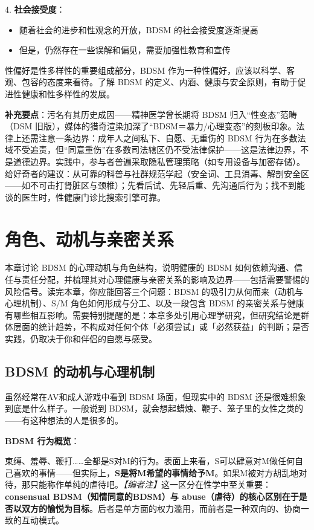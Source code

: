 \documentclass[12pt,UTF8]{ctexbook}
\begin{document}
4. \textbf{社会接受度}：
  \begin{itemize}
  \item 随着社会的进步和性观念的开放，BDSM 的社会接受度逐渐提高
  \item 但是，仍然存在一些误解和偏见，需要加强性教育和宣传
  \end{itemize}

性偏好是性多样性的重要组成部分，BDSM 作为一种性偏好，应该以科学、客观、包容的态度来看待。了解 BDSM 的定义、内涵、健康与安全原则，有助于促进性健康和性多样性的发展。

\noindent\textbf{补充要点}：污名有其历史成因——精神医学曾长期将 BDSM 归入“性变态”范畴（DSM 旧版），媒体的猎奇渲染加深了“BDSM＝暴力/心理变态”的刻板印象。法律上还需注意一条边界：成年人之间私下、自愿、无重伤的 BDSM 行为在多数法域不受追责，但“同意重伤”在多数司法辖区仍不受法律保护——这是法律边界，不是道德边界。实践中，参与者普遍采取隐私管理策略（如专用设备与加密存储）。给好奇者的建议：从可靠的科普与社群规范学起（安全词、工具消毒、解剖安全区——如不可击打肾脏区与颈椎）；先看后试、先轻后重、先沟通后行为；找不到能谈的医生时，性健康门诊比搜索引擎可靠。

\chapter{角色、动机与亲密关系}

本章讨论 BDSM 的心理动机与角色结构，说明健康的 BDSM 如何依赖沟通、信任与责任分配，并梳理其对心理健康与亲密关系的影响及边界——包括需要警惕的风险信号。读完本章，你应能回答三个问题：BDSM 的吸引力从何而来（动机与心理机制）、S/M 角色如何形成与分工、以及一段包含 BDSM 的亲密关系与健康有哪些相互影响。需要特别提醒的是：本章多处引用心理学研究，但研究结论是群体层面的统计趋势，不构成对任何个体「必须尝试」或「必然获益」的判断；是否实践，仍取决于你和伴侣的自愿与感受。

\section{BDSM 的动机与心理机制}

虽然经常在AV和成人游戏中看到 BDSM 场面，但现实中的 BDSM 还是很难想象到底是什么样子。一般说到 BDSM，就会想起蜡烛、鞭子、笼子里的女性之类的——有这种想法的人是很多的。

\noindent\textbf{BDSM 行为概览}：

束缚、羞辱、鞭打……全都是S对M的行为。表面上来看，S可以肆意对M做任何自己喜欢的事情——但实际上，\textbf{S是将M希望的事情给予M}。如果M被对方胡乱地对待，那只能称作单纯的虐待吧。\textit{【编者注】}这一区分在性学中至关重要：\textbf{consensual BDSM（知情同意的BDSM）与 abuse（虐待）的核心区别在于是否以双方的愉悦为目标}。后者是单方面的权力滥用，而前者是一种双向的、协商一致的互动模式。
\end{document}
